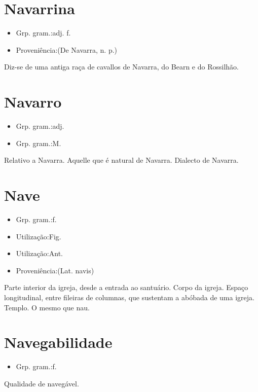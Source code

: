 \section{Navarrina}
\begin{itemize}
\item {Grp. gram.:adj. f.}
\end{itemize}
\begin{itemize}
\item {Proveniência:(De \textunderscore Navarra\textunderscore , n. p.)}
\end{itemize}
Diz-se de uma antiga raça de cavallos de Navarra, do Bearn e do Rossilhão.
\section{Navarro}
\begin{itemize}
\item {Grp. gram.:adj.}
\end{itemize}
\begin{itemize}
\item {Grp. gram.:M.}
\end{itemize}
Relativo a Navarra.
Aquelle que é natural de Navarra.
Dialecto de Navarra.
\section{Nave}
\begin{itemize}
\item {Grp. gram.:f.}
\end{itemize}
\begin{itemize}
\item {Utilização:Fig.}
\end{itemize}
\begin{itemize}
\item {Utilização:Ant.}
\end{itemize}
\begin{itemize}
\item {Proveniência:(Lat. \textunderscore navis\textunderscore )}
\end{itemize}
Parte interior da igreja, desde a entrada ao santuário.
Corpo da igreja.
Espaço longitudinal, entre fileiras de columnas, que sustentam a abóbada de uma igreja.
Templo.
O mesmo que \textunderscore nau\textunderscore .
\section{Navegabilidade}
\begin{itemize}
\item {Grp. gram.:f.}
\end{itemize}
Qualidade de navegável.
